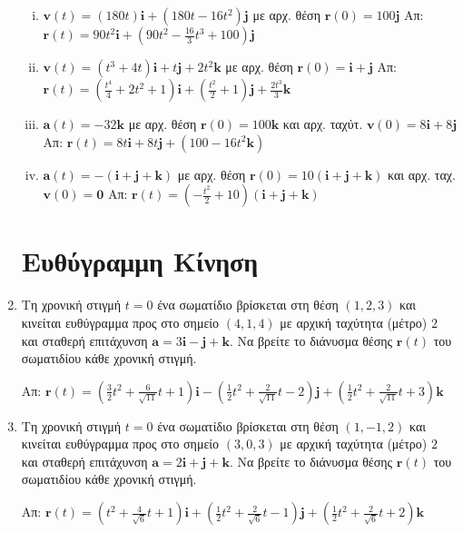 \begin{enumerate}
\begin{enumerate}[i)]
      \item $ \mathbf{v}(t) =(180t) \mathbf{i}+(180t-16t^{2}) \mathbf{j} $ με αρχ. 
        θέση $ \mathbf{r}(0)=100 \mathbf{j} $
        \hfill Απ: $ \mathbf{r}(t) = 90t^{2} \mathbf{i}+(90t^{2}- \frac{16}{3} t^{3}+100)
        \mathbf{j} $ 

      \item $ \mathbf{v}(t) = (t^{3}+4t) \mathbf{i} +t \mathbf{j}+2t^{2} \mathbf{k} $ 
        με αρχ. θέση $ \mathbf{r}(0) = \mathbf{i}+ \mathbf{j} $
        \hfill Απ: $ \mathbf{r}(t) = (\frac{t^{4}}{4} + 2t^{2}+1) \mathbf{i}+
        (\frac{t^{2}}{2}+1) \mathbf{j}+ \frac{2t^{3}}{3} \mathbf{k} $  

      \item $ \mathbf{a}(t) = -32 \mathbf{k} $ με αρχ. θέση $ \mathbf{r}(0) = 100
        \mathbf{k} $ και αρχ. ταχύτ. $ \mathbf{v}(0)=8 \mathbf{i}+8 \mathbf{j} $
        \hfill Απ: $ \mathbf{r}(t) = 8t \mathbf{i} +8t \mathbf{j}+ (100-16t^{2}
        \mathbf{k}) $ 

      \item $ \mathbf{a}(t) = -(\mathbf{i}+ \mathbf{j}+ \mathbf{k}) $ με 
        αρχ. θέση $ \mathbf{r}(0) = 10 (\mathbf{i}+\mathbf{j}+\mathbf{k}) $ 
        και αρχ. ταχ. $ \mathbf{v}(0)= \mathbf{0}$ 
        \hfill Απ: $ \mathbf{r}(t) = (- \frac{t^{2}}{2} +10) (\mathbf{i}+  \mathbf{j}+  
        \mathbf{k}) $ 
    \end{enumerate}

    \section*{Ευθύγραμμη Κίνηση}
    
  \item Τη χρονική στιγμή $t=0$ ένα σωματίδιο βρίσκεται στη θέση $ (1,2,3) $ και 
    κινείται ευθύγραμμα προς στο σημείο $ (4,1,4) $ με αρχική ταχύτητα (μέτρο) $ 2 $ 
    και σταθερή επιτάχυνση $ \mathbf{a}= 3 \mathbf{i}- \mathbf{j}+ \mathbf{k} $. 
    Να βρείτε το διάνυσμα θέσης $ \mathbf{r}(t) $ του σωματιδίου κάθε χρονική στιγμή.

    \hfill Απ: $ \mathbf{r}(t)=(\frac{3}{2} t^{2}+ \frac{6}{\sqrt{11}} t+1)
    \mathbf{i}-(\frac{1}{2} t^{2}+ \frac{2}{\sqrt{11}} t-2) \mathbf{j}+
    (\frac{1}{2} t^{2}+ \frac{2}{\sqrt{11}}t+3) \mathbf{k} $ 

  \item Τη χρονική στιγμή $t=0$ ένα σωματίδιο βρίσκεται στη θέση $ (1,-1,2) $ και 
    κινείται ευθύγραμμα προς στο σημείο $ (3,0,3) $ με αρχική ταχύτητα (μέτρο) $ 2 $ 
    και σταθερή επιτάχυνση $ \mathbf{a}= 2 \mathbf{i}+ \mathbf{j}+ \mathbf{k} $. 
    Να βρείτε το διάνυσμα θέσης $ \mathbf{r}(t) $ του σωματιδίου κάθε χρονική στιγμή.

    \hfill Απ: $ \mathbf{r}(t) = (t^{2}+ \frac{4}{\sqrt{6}} t+1)
    \mathbf{i}+(\frac{1}{2} t^{2}+ \frac{2}{\sqrt{6}} t-1)
    \mathbf{j}+(\frac{1}{2} t^{2}+ \frac{2}{\sqrt{6}} t+2) \mathbf{k} $ 
\end{enumerate}


